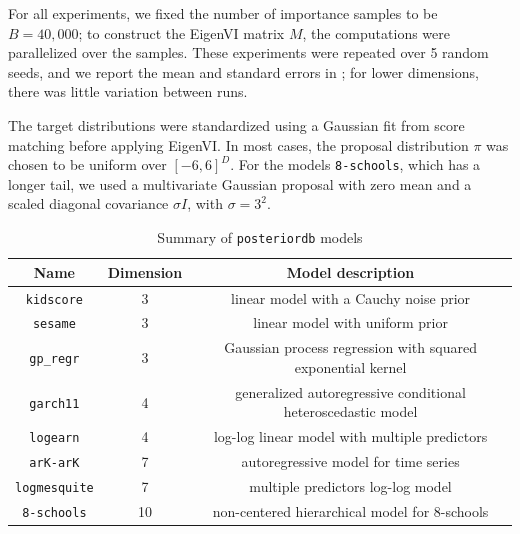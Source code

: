 For all experiments, we fixed the number of importance samples to be
$B=40{,}000$; to construct the EigenVI matrix $M$, the computations were parallelized
over the samples.
These experiments were repeated over 5 random seeds, and we report the mean and standard errors in
; for lower dimensions, there was little variation between runs.

The target distributions were standardized using a Gaussian fit from score matching
before applying EigenVI.
In most cases, the proposal distribution $\pi$ was chosen to be uniform over $[-6,6]^D$.
For the models \texttt{8-schools},
which has a longer tail, we used a multivariate Gaussian proposal with zero mean
and a scaled diagonal covariance $\sigma I$, with $\sigma = 3^2$.

\begin{table}
\caption{Summary of \texttt{posteriordb} models}
\label{table:posteriordb}
    \centering
    \small
\begin{tabular}{ccc}
    \toprule
    Name & Dimension & Model description \\
    \midrule
    \texttt{kidscore} & 3 & linear model with a Cauchy noise prior \\
    \texttt{sesame} & 3 & linear model with uniform prior \\
    \texttt{gp\_regr} & 3 & Gaussian process regression with squared exponential kernel \\
    \texttt{garch11} & 4 & generalized autoregressive conditional heteroscedastic model \\
    \texttt{logearn} & 4 & log-log linear model with multiple predictors \\
    \texttt{arK-arK} & 7 & autoregressive model for time series \\
    \texttt{logmesquite} & 7 & multiple predictors log-log model  \\
    \texttt{8-schools} & 10 & non-centered hierarchical model for 8-schools \\
    \bottomrule
\end{tabular}
\end{table}


